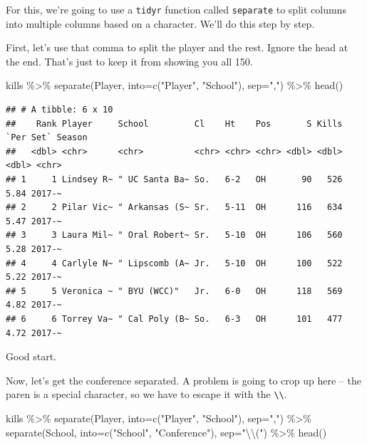\documentclass[
]{book}
\newenvironment{Shaded}{\begin{snugshade}}{\end{snugshade}}
\newcommand{\AttributeTok}[1]{\textcolor[rgb]{0.77,0.63,0.00}{#1}}
\newcommand{\FunctionTok}[1]{\textcolor[rgb]{0.00,0.00,0.00}{#1}}
\newcommand{\NormalTok}[1]{#1}
\newcommand{\SpecialCharTok}[1]{\textcolor[rgb]{0.00,0.00,0.00}{#1}}
\newcommand{\StringTok}[1]{\textcolor[rgb]{0.31,0.60,0.02}{#1}}
\begin{document}
For this, we're going to use a \texttt{tidyr} function called \texttt{separate} to split columns into multiple columns based on a character. We'll do this step by step.

First, let's use that comma to split the player and the rest. Ignore the head at the end. That's just to keep it from showing you all 150.

\begin{Shaded}
\begin{Highlighting}[]
\NormalTok{kills }\SpecialCharTok{\%\textgreater{}\%} \FunctionTok{separate}\NormalTok{(Player, }\AttributeTok{into=}\FunctionTok{c}\NormalTok{(}\StringTok{"Player"}\NormalTok{, }\StringTok{"School"}\NormalTok{), }\AttributeTok{sep=}\StringTok{","}\NormalTok{) }\SpecialCharTok{\%\textgreater{}\%} \FunctionTok{head}\NormalTok{()}
\end{Highlighting}
\end{Shaded}

\begin{verbatim}
## # A tibble: 6 x 10
##    Rank Player     School         Cl    Ht    Pos       S Kills `Per Set` Season
##   <dbl> <chr>      <chr>          <chr> <chr> <chr> <dbl> <dbl>     <dbl> <chr> 
## 1     1 Lindsey R~ " UC Santa Ba~ So.   6-2   OH       90   526      5.84 2017-~
## 2     2 Pilar Vic~ " Arkansas (S~ Sr.   5-11  OH      116   634      5.47 2017-~
## 3     3 Laura Mil~ " Oral Robert~ Sr.   5-10  OH      106   560      5.28 2017-~
## 4     4 Carlyle N~ " Lipscomb (A~ Jr.   5-10  OH      100   522      5.22 2017-~
## 5     5 Veronica ~ " BYU (WCC)"   Jr.   6-0   OH      118   569      4.82 2017-~
## 6     6 Torrey Va~ " Cal Poly (B~ So.   6-3   OH      101   477      4.72 2017-~
\end{verbatim}

Good start.

Now, let's get the conference separated. A problem is going to crop up here -- the paren is a special character, so we have to escape it with the \texttt{\textbackslash{}\textbackslash{}}.

\begin{Shaded}
\begin{Highlighting}[]
\NormalTok{kills }\SpecialCharTok{\%\textgreater{}\%} 
  \FunctionTok{separate}\NormalTok{(Player, }\AttributeTok{into=}\FunctionTok{c}\NormalTok{(}\StringTok{"Player"}\NormalTok{, }\StringTok{"School"}\NormalTok{), }\AttributeTok{sep=}\StringTok{","}\NormalTok{) }\SpecialCharTok{\%\textgreater{}\%}
  \FunctionTok{separate}\NormalTok{(School, }\AttributeTok{into=}\FunctionTok{c}\NormalTok{(}\StringTok{"School"}\NormalTok{, }\StringTok{"Conference"}\NormalTok{), }\AttributeTok{sep=}\StringTok{"}\SpecialCharTok{\textbackslash{}\textbackslash{}}\StringTok{("}\NormalTok{) }\SpecialCharTok{\%\textgreater{}\%} 
  \FunctionTok{head}\NormalTok{()}
\end{Highlighting}
\end{Shaded}
\end{document}
